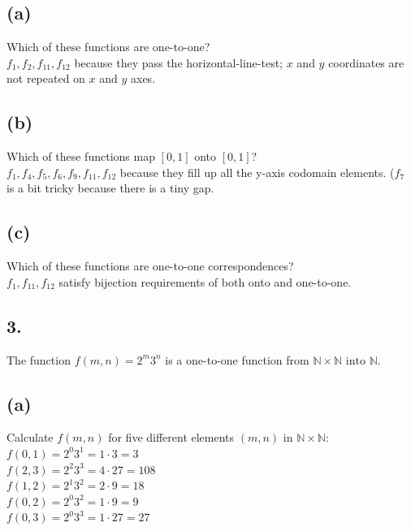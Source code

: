 \documentclass[11pt]{article}
\begin{document}
\subsection*{(a)}
\begin{center}
Which of these functions are one-to-one?\\
\hfill \break
$f_1, f_2, f_{11}, f_{12}$ because they pass the horizontal-line-test; $x$ and $y$ coordinates are not repeated on $x$ and $y$ axes.
\end{center}

\hfill \break
\subsection*{(b)}
\begin{center}
Which of these functions map $[0,1]$ onto $[0,1]$?\\
\hfill \break
$f_1, f_4, f_5, f_6, f_9, f_{11}, f_{12}$ because they fill up all the y-axis codomain elements. ($f_7$ is a bit tricky because there is a tiny gap.
\end{center}

\subsection*{(c)}
\begin{center}
Which of these functions are one-to-one correspondences?\\
\hfill \break
$f_1, f_{11}, f_{12}$ satisfy bijection requirements of both onto and one-to-one.
\end{center}
%
%
\subsection*{3.}
\begin{center}
The function $f(m,n) = 2^{m}3^{n}$ is a one-to-one function from $\mathbb{N} \times \mathbb{N} \text{ into } \mathbb{N}$.
\end{center}

\subsection*{(a)}
\begin{center}
Calculate $f(m,n)$ for five different elements $(m,n)$ in $\mathbb{N} \times \mathbb{N}$:\\
\hfill \break
$f(0,1) = 2^{0}3^{1} = 1 \cdot 3 = 3$\\
$f(2,3) = 2^{2}3^{3} = 4 \cdot 27 = 108$\\
$f(1,2) = 2^{1}3^{2} = 2 \cdot 9 = 18$\\
$f(0,2) = 2^{0}3^{2} = 1 \cdot 9 = 9$\\
$f(0,3) = 2^{0}3^{3} = 1 \cdot 27 = 27$ 
\end{center}
%
%
\end{document}
